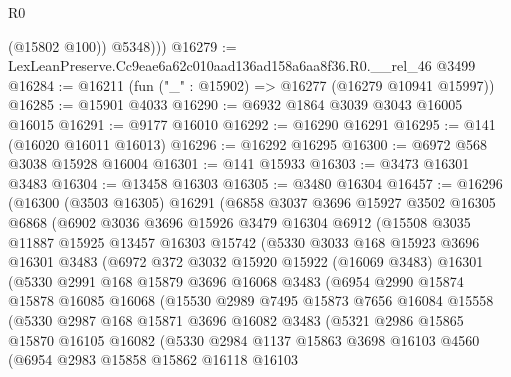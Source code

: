 \begin{lexlean}{R0}
\begin{coremodule}
            (@15802 @100))
          @5348)))
@16279 := LexLeanPreserve.Cc9eae6a62c010aad136ad158a6aa8f36.R0.__rel_46 @3499
@16284 := @16211 (fun ("_" : @15902) => @16277 (@16279 @10941 @15997))
@16285 := @15901 @4033
@16290 := @6932 @1864 @3039 @3043 @16005 @16015
@16291 := @9177 @16010
@16292 := @16290 @16291
@16295 := @141 (@16020 @16011 @16013)
@16296 := @16292 @16295
@16300 := @6972 @568 @3038 @15928 @16004
@16301 := @141 @15933
@16303 := @3473 @16301 @3483
@16304 := @13458 @16303
@16305 := @3480 @16304
@16457 := @16296
    (@16300
      (@3503 @16305)
      @16291
      (@6858
        @3037
        @3696
        @15927
        @3502
        @16305
        @6868
        (@6902
          @3036
          @3696
          @15926
          @3479
          @16304
          @6912
          (@15508
            @3035
            @11887
            @15925
            @13457
            @16303
            @15742
            (@5330
              @3033
              @168
              @15923
              @3696
              @16301
              @3483
              (@6972
                @372
                @3032
                @15920
                @15922
                (@16069 @3483)
                @16301
                (@5330
                  @2991
                  @168
                  @15879
                  @3696
                  @16068
                  @3483
                  (@6954
                    @2990
                    @15874
                    @15878
                    @16085
                    @16068
                    (@15530
                      @2989
                      @7495
                      @15873
                      @7656
                      @16084
                      @15558
                      (@5330
                        @2987
                        @168
                        @15871
                        @3696
                        @16082
                        @3483
                        (@5321
                          @2986
                          @15865
                          @15870
                          @16105
                          @16082
                          (@5330
                            @2984
                            @1137
                            @15863
                            @3698
                            @16103
                            @4560
                            (@6954
                              @2983
                              @15858
                              @15862
                              @16118
                              @16103

\end{coremodule}
\end{lexlean}
